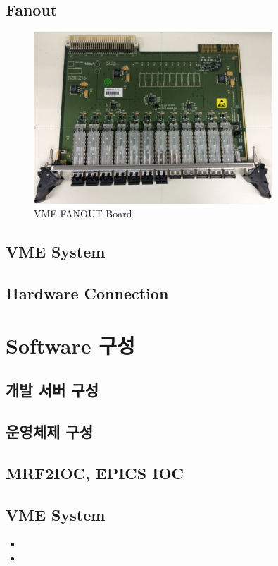 \documentclass[11pt
  , a4paper
  , article
  , oneside
]{memoir}
\begin{document}
\clearpage

\section{Fanout}

\begin{figure}[h!]
	\centering
	\includegraphics[width=0.8\textwidth]{./images/fanout.eps}
	\caption{VME-FANOUT Board}
	\label{fig:fanout_board} 
\end{figure}

\section{VME System}

\section{Hardware Connection}

\clearpage

\chapter{Software 구성}
\section{개발 서버 구성}
\section{운영체제 구성}

\section{MRF2IOC, EPICS IOC}

\section{VME System}


\begin{itemize}
	\item 
	\item 
\end{itemize}



\clearpage


\end{document}
